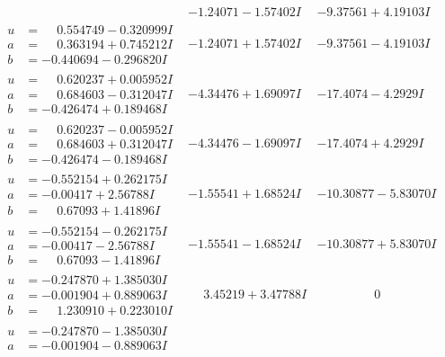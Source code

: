 \documentclass[1p]{elsarticle_modified}
\theoremstyle{definition}
\begin{document}
$$\begin{array}{c|c|c}
 & -1.24071 - 1.57402 I & -9.37561 + 4.19103 I \\ \hline\begin{aligned}
u &= \phantom{-}0.554749 - 0.320999 I \\
a &= \phantom{-}0.363194 + 0.745212 I \\
b &= -0.440694 - 0.296820 I\end{aligned}
 & -1.24071 + 1.57402 I & -9.37561 - 4.19103 I \\ \hline\begin{aligned}
u &= \phantom{-}0.620237 + 0.005952 I \\
a &= \phantom{-}0.684603 - 0.312047 I \\
b &= -0.426474 + 0.189468 I\end{aligned}
 & -4.34476 + 1.69097 I & -17.4074 - 4.2929 I \\ \hline\begin{aligned}
u &= \phantom{-}0.620237 - 0.005952 I \\
a &= \phantom{-}0.684603 + 0.312047 I \\
b &= -0.426474 - 0.189468 I\end{aligned}
 & -4.34476 - 1.69097 I & -17.4074 + 4.2929 I \\ \hline\begin{aligned}
u &= -0.552154 + 0.262175 I \\
a &= -0.00417 + 2.56788 I \\
b &= \phantom{-}0.67093 + 1.41896 I\end{aligned}
 & -1.55541 + 1.68524 I & -10.30877 - 5.83070 I \\ \hline\begin{aligned}
u &= -0.552154 - 0.262175 I \\
a &= -0.00417 - 2.56788 I \\
b &= \phantom{-}0.67093 - 1.41896 I\end{aligned}
 & -1.55541 - 1.68524 I & -10.30877 + 5.83070 I \\ \hline\begin{aligned}
u &= -0.247870 + 1.385030 I \\
a &= -0.001904 + 0.889063 I \\
b &= \phantom{-}1.230910 + 0.223010 I\end{aligned}
 & \phantom{-}3.45219 + 3.47788 I & \phantom{-0.000000 } 0 \\ \hline\begin{aligned}
u &= -0.247870 - 1.385030 I \\
a &= -0.001904 - 0.889063 I \\

\end{aligned}
\end{array}$$
\end{document}
